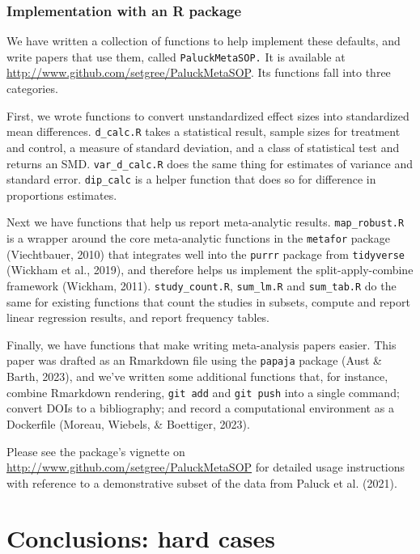 \documentclass[
  ,jou]{apa6}
\begin{document}
\subsubsection{Implementation with an R package}\label{implementation-with-an-r-package}

We have written a collection of functions to help implement these defaults, and write papers that use them, called \texttt{PaluckMetaSOP.} It is available at \url{http://www.github.com/setgree/PaluckMetaSOP}. Its functions fall into three categories.

First, we wrote functions to convert unstandardized effect sizes into standardized mean differences. \texttt{d\_calc.R} takes a statistical result, sample sizes for treatment and control, a measure of standard deviation, and a class of statistical test and returns an SMD. \texttt{var\_d\_calc.R} does the same thing for estimates of variance and standard error. \texttt{dip\_calc} is a helper function that does so for difference in proportions estimates.

Next we have functions that help us report meta-analytic results. \texttt{map\_robust.R} is a wrapper around the core meta-analytic functions in the \texttt{metafor} package (Viechtbauer, 2010) that integrates well into the \texttt{purrr} package from \texttt{tidyverse} (Wickham et al., 2019), and therefore helps us implement the split-apply-combine framework (Wickham, 2011). \texttt{study\_count.R}, \texttt{sum\_lm.R} and \texttt{sum\_tab.R} do the same for existing functions that count the studies in subsets, compute and report linear regression results, and report frequency tables.

Finally, we have functions that make writing meta-analysis papers easier. This paper was drafted as an Rmarkdown file using the \texttt{papaja} package (Aust \& Barth, 2023), and we've written some additional functions that, for instance, combine Rmarkdown rendering, \texttt{git\ add} and \texttt{git\ push} into a single command; convert DOIs to a bibliography; and record a computational environment as a Dockerfile (Moreau, Wiebels, \& Boettiger, 2023).

Please see the package's vignette on \url{http://www.github.com/setgree/PaluckMetaSOP} for detailed usage instructions with reference to a demonstrative subset of the data from Paluck et al. (2021).

\section{Conclusions: hard cases}\label{conclusions-hard-cases}
\end{document}
